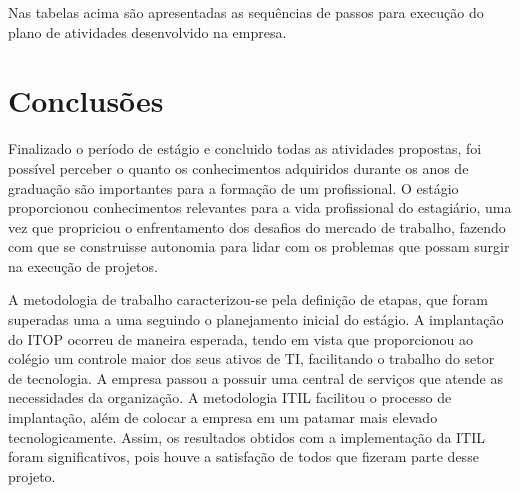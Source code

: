 \documentclass[eso]{bcc}
\begin{document}
Nas tabelas acima são apresentadas as sequências de passos para execução do plano de atividades desenvolvido na empresa.

\chapter{Conclusões}

\label{chap:conclusao}

Finalizado o período de estágio e concluido todas as atividades propostas, foi possível perceber o quanto os conhecimentos adquiridos durante os anos de graduação são importantes para a formação de um  profissional.  O estágio proporcionou conhecimentos relevantes para a vida profissional do estagiário, uma vez que propriciou o enfrentamento dos desafios do mercado de trabalho, fazendo com que se construisse autonomia para lidar com os problemas que possam surgir na execução de projetos.

A metodologia de trabalho caracterizou-se pela definição de etapas, que foram superadas uma a uma  seguindo o planejamento inicial do estágio. A implantação do ITOP ocorreu de maneira esperada, tendo em vista que proporcionou ao colégio  um controle maior dos seus ativos de TI, facilitando o trabalho do setor de tecnologia. A empresa passou a possuir uma central de serviços que atende as necessidades da organização.  A metodologia ITIL facilitou o processo de implantação, além de colocar a empresa em um patamar mais elevado tecnologicamente. Assim, os resultados obtidos com a implementação da ITIL foram significativos, pois houve a satisfação de todos que fizeram parte desse projeto. 









\end{document}
